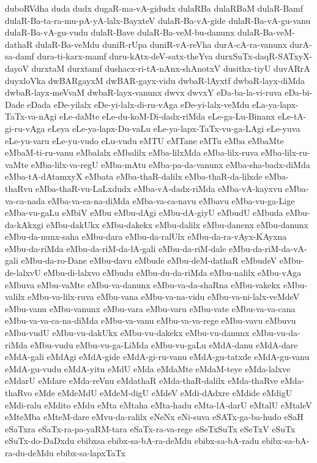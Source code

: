 {duboRVdha
duda
dudx
dugaR-ma-vA-gidudx
dulaRBa
dulaRBaM
dulaR-Bamf
dulaR-Ba-ta-ra-mu-pA-yA-lalx-BayxteV
dulaR-Ba-vA-gide
dulaR-Ba-vA-gu-vanu
dulaR-Ba-vA-gu-vudu
dulaR-Bave
dulaR-Ba-veM-bu-danunx
dulaR-Ba-veM-dathaR
dulaR-Ba-veMdu
duniR-rUpa
duniR-vA-reVha
durA-cA-ra-vanunx
durA-sa-damf
dura-ti-karx-mamf
duru-kAtx-deV-satx-theYva
durxSuTx-daqR-SATxyX-dayoV
durxtaM
durxtamf
dushacx-ri-tA-nAnx-shAnotxV
dusithx-tiyU
duvARrA
duyxloVka
dwBARgayxM
dwBAR-gayx-vidu
dwbaR-lAyxtf
dwbaR-layx-diMda
dwbaR-layx-meVvaM
dwbaR-layx-vanunx
dwvx
dwvxY
eDa-ba-la-vi-ruva
eDa-bi-Dade
eDada
eDe-yilalx
eDe-yi-lalx-di-ru-vAga
eDe-yi-lalx-veMdu
eLa-ya-lapx-TaTx-va-nAgi
eLe-daMte
eLe-du-koM-Di-dadx-riMda
eLe-ga-Lu-Binanx
eLe-tA-gi-ru-vAga
eLeya
eLe-ya-lapx-Du-vaLu
eLe-ya-lapx-TaTx-vu-ga-LAgi
eLe-yuva
eLe-yu-varu
eLe-yu-vudo
eLu-vudu
eMTU
eMTane
eMTu
eMba
eMbaMte
eMbaM-ti-ru-vanu
eMbalalx
eMbalilx
eMba-lilxMda
eMba-lilx-ruva
eMba-lilx-ru-vaMte
eMba-lilx-va-regU
eMba-mAtu
eMba-pa-da-vanunx
eMba-sha-badx-diMda
eMba-tA-dAtamxyX
eMbata
eMba-thaR-dalilx
eMba-thaR-da-lilxde
eMba-thaRvu
eMba-thaR-vu-LaLxdudx
eMba-vA-dadx-riMda
eMba-vA-kayxvu
eMba-va-ca-nada
eMba-va-ca-na-diMda
eMba-va-ca-navu
eMbavu
eMba-vu-ga-Lige
eMba-vu-gaLu
eMbiV
eMbu
eMbu-dAgi
eMbu-dA-giyU
eMbudU
eMbuda
eMbu-da-kAkxgi
eMbu-dakUkx
eMbu-dakekx
eMbu-dalilx
eMbu-danenx
eMbu-danunx
eMbu-da-nunx-saha
eMbu-dara
eMbu-da-ralUlx
eMbu-da-ra-vAyx-KAyxna
eMbu-da-riMda
eMbu-da-riM-da-lA-gali
eMbu-da-riM-dale
eMbu-da-riM-da-vA-gali
eMbu-da-ro-Dane
eMbu-davu
eMbude
eMbu-deM-dathaR
eMbudeV
eMbu-de-lalxvU
eMbu-di-lalxvo
eMbudu
eMbu-du-da-riMda
eMbu-nalilx
eMbu-vAga
eMbuva
eMbu-vaMte
eMbu-va-danunx
eMbu-va-da-shaRna
eMbu-vakekx
eMbu-valilx
eMbu-va-lilx-ruva
eMbu-vana
eMbu-va-na-vidu
eMbu-va-ni-lalx-veMdeV
eMbu-vanu
eMbu-vanunx
eMbu-vara
eMbu-varu
eMbu-vate
eMbu-va-va-cana
eMbu-va-va-ca-na-diMda
eMbu-va-vanu
eMbu-va-va-rege
eMbu-vavu
eMbuvu
eMbu-vudU
eMbu-vu-dakUkx
eMbu-vu-dakekx
eMbu-vu-danunx
eMbu-vu-da-riMda
eMbu-vudu
eMbu-vu-ga-LiMda
eMbu-vu-gaLu
eMdA-danu
eMdA-dare
eMdA-gali
eMdAgi
eMdA-gide
eMdA-gi-ru-vanu
eMdA-gu-tatxde
eMdA-gu-vanu
eMdA-gu-vudu
eMdA-yitu
eMdU
eMda
eMdaMte
eMdaM-teye
eMda-lalxve
eMdarU
eMdare
eMda-reVnu
eMdathaR
eMda-thaR-dalilx
eMda-thaRve
eMda-thaRvo
eMde
eMdeMdU
eMdeM-digU
eMdeV
eMdi-dAdxre
eMdide
eMdigU
eMdi-ralu
eMdito
eMdu
eMta
eMtaha
eMta-hadu
eMta-lA-darU
eMtalU
eMtaleV
eMteMba
eMteM-dare
eMvu-da-ralilx
eNeNx
eNi-suva
eSATx-ga-ba-hudo
eSaH
eSaTxra
eSaTx-ra-pa-yaRM-tara
eSaTx-ra-va-rege
eSeTxSuTx
eSeTxV
eSuTx
eSuTx-do-DaDxdu
ebibxsa
ebibx-sa-bA-ra-deMdu
ebibx-sa-bA-radu
ebibx-sa-bA-ra-du-deMdu
ebibx-sa-lapxTaTx
}
